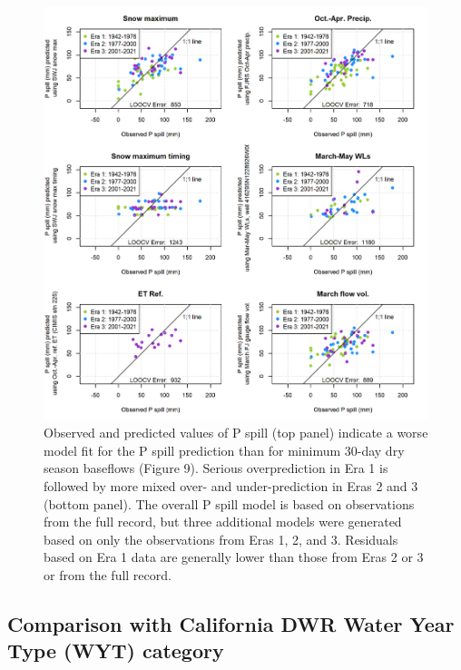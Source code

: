 \documentclass[hess, manuscript]{copernicus}
\begin{document}
\begin{figure}
\includegraphics[width=1\linewidth]{f14} \caption{\label{fig:pspill_pred_over_time} Observed and predicted values of P spill (top panel) indicate a worse model fit for the P spill prediction than for minimum 30-day dry season baseflows (Figure 9). Serious overprediction in Era 1 is followed by more mixed over- and under-prediction in Eras 2 and 3 (bottom panel). The overall P spill model is based on observations from the full record, but three additional models were generated based on only the observations from Eras 1, 2, and 3. Residuals based on Era 1 data are generally lower than those from Eras 2 or 3 or from the full record.}\label{fig:pspill_pred_over_time}
\end{figure}

\subsection{Comparison with California DWR Water Year Type (WYT)
category}
\end{document}
